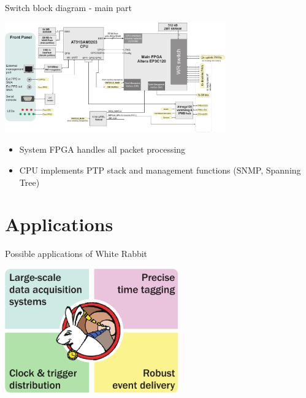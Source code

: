 \documentclass[xcolor=dvipsnames]{beamer}
\begin{document}
\begin{frame}{Switch block diagram - main part}
\begin{center}
\includegraphics[width=9.5cm]{switch/wrs2_fpga_diagram.pdf}
\end{center}
\begin{itemize}
\item System FPGA handles all packet processing
\item CPU implements PTP stack and management functions (SNMP, Spanning Tree)
\end{itemize}
\end{frame}

\section{Applications}

\begin{frame}{Possible applications of White Rabbit}
\begin{center}
\includegraphics[width=7.5cm]{applications/wr_apps.pdf}
\end{center}
\end{frame}
\end{document}
